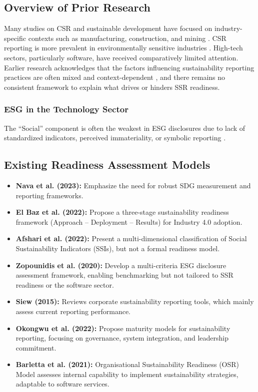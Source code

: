 \subsection{Overview of Prior Research}
Many studies on CSR and sustainable development have focused on industry-specific contexts such as manufacturing, construction, and mining \parencite{Ye2020, Afshari2022}. CSR reporting is more prevalent in environmentally sensitive industries \parencite{Lock2016}. High-tech sectors, particularly software, have received comparatively limited attention. Earlier research acknowledges that the factors influencing sustainability reporting practices are often mixed and context-dependent \parencite{Fifka2012}, and there remains no consistent framework to explain what drives or hinders SSR readiness.

\subsubsection{ESG in the Technology Sector}
The “Social” component is often the weakest in ESG disclosures due to lack of standardized indicators, perceived immateriality, or symbolic reporting \parencite{Christensen2021, Reitmaier2025}.

\subsection{Existing Readiness Assessment Models}
\begin{itemize}
    \item \textbf{Nava et al. (2023):} Emphasize the need for robust SDG measurement and reporting frameworks.
    \item \textbf{El Baz et al. (2022):} Propose a three-stage sustainability readiness framework (Approach – Deployment – Results) for Industry 4.0 adoption.
    \item \textbf{Afshari et al. (2022):} Present a multi-dimensional classification of Social Sustainability Indicators (SSIs), but not a formal readiness model.
    \item \textbf{Zopounidis et al. (2020):} Develop a multi-criteria ESG disclosure assessment framework, enabling benchmarking but not tailored to SSR readiness or the software sector.
    \item \textbf{Siew (2015):} Reviews corporate sustainability reporting tools, which mainly assess current reporting performance.
    \item \textbf{Okongwu et al. (2022):} Propose maturity models for sustainability reporting, focusing on governance, system integration, and leadership commitment.
    \item \textbf{Barletta et al. (2021):} Organisational Sustainability Readiness (OSR) Model assesses internal capability to implement sustainability strategies, adaptable to software services.
\end{itemize}

